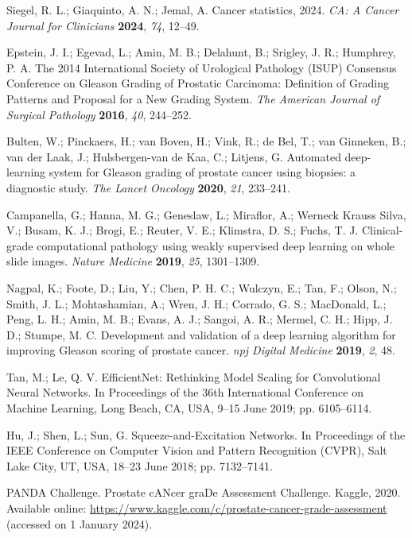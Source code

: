Siegel, R. L.; Giaquinto, A. N.; Jemal, A. Cancer statistics, 2024. \textit{CA: A Cancer Journal for Clinicians} \textbf{2024}, \textit{74}, 12--49.

Epstein, J. I.; Egevad, L.; Amin, M. B.; Delahunt, B.; Srigley, J. R.; Humphrey, P. A. The 2014 International Society of Urological Pathology (ISUP) Consensus Conference on Gleason Grading of Prostatic Carcinoma: Definition of Grading Patterns and Proposal for a New Grading System. \textit{The American Journal of Surgical Pathology} \textbf{2016}, \textit{40}, 244--252.

Bulten, W.; Pinckaers, H.; van Boven, H.; Vink, R.; de Bel, T.; van Ginneken, B.; van der Laak, J.; Hulsbergen-van de Kaa, C.; Litjens, G. Automated deep-learning system for Gleason grading of prostate cancer using biopsies: a diagnostic study. \textit{The Lancet Oncology} \textbf{2020}, \textit{21}, 233--241.

Campanella, G.; Hanna, M. G.; Geneslaw, L.; Miraflor, A.; Werneck Krauss Silva, V.; Busam, K. J.; Brogi, E.; Reuter, V. E.; Klimstra, D. S.; Fuchs, T. J. Clinical-grade computational pathology using weakly supervised deep learning on whole slide images. \textit{Nature Medicine} \textbf{2019}, \textit{25}, 1301--1309.

Nagpal, K.; Foote, D.; Liu, Y.; Chen, P. H. C.; Wulczyn, E.; Tan, F.; Olson, N.; Smith, J. L.; Mohtashamian, A.; Wren, J. H.; Corrado, G. S.; MacDonald, L.; Peng, L. H.; Amin, M. B.; Evans, A. J.; Sangoi, A. R.; Mermel, C. H.; Hipp, J. D.; Stumpe, M. C. Development and validation of a deep learning algorithm for improving Gleason scoring of prostate cancer. \textit{npj Digital Medicine} \textbf{2019}, \textit{2}, 48.

Tan, M.; Le, Q. V. EfficientNet: Rethinking Model Scaling for Convolutional Neural Networks. In Proceedings of the 36th International Conference on Machine Learning, Long Beach, CA, USA, 9--15 June 2019; pp. 6105--6114.

Hu, J.; Shen, L.; Sun, G. Squeeze-and-Excitation Networks. In Proceedings of the IEEE Conference on Computer Vision and Pattern Recognition (CVPR), Salt Lake City, UT, USA, 18--23 June 2018; pp. 7132--7141.


PANDA Challenge. Prostate cANcer graDe Assessment Challenge. Kaggle, 2020. Available online: \url{https://www.kaggle.com/c/prostate-cancer-grade-assessment} (accessed on 1 January 2024).

